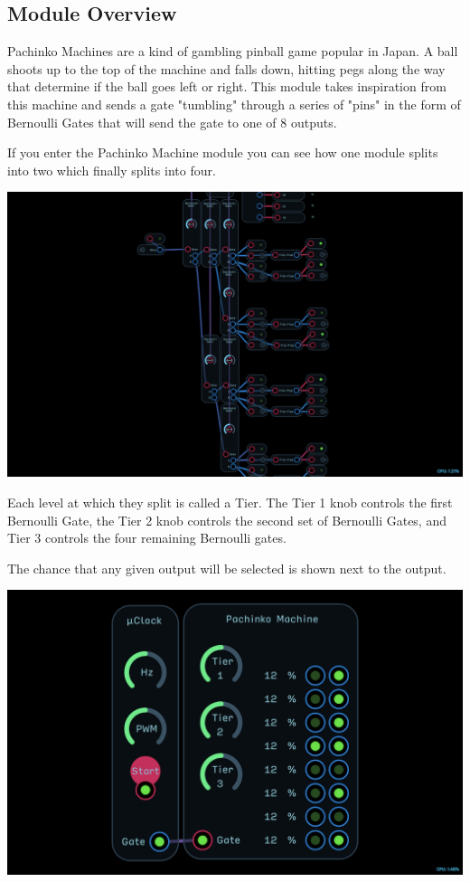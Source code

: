 \documentclass[11pt]{book}
\begin{document}
\begin{multicols*}{2}

\subsection*{Module Overview}

Pachinko Machines are a kind of gambling pinball game popular in Japan. A ball shoots up to the top of the machine and falls down, hitting pegs along the way that determine if the ball goes left or right. This module takes inspiration from this machine and sends a gate "tumbling" through a series of "pins" in the form of Bernoulli Gates that will send the gate to one of 8 outputs.

If you enter the Pachinko Machine module you can see how one module splits into two which finally splits into four.

\begin{center}
\includegraphics[width=0.95\linewidth]{pachinko-machine-fig1.png}
\end{center}

Each level at which they split is called a Tier. The Tier 1 knob controls the first Bernoulli Gate, the Tier 2 knob controls the second set of Bernoulli Gates, and Tier 3 controls the four remaining Bernoulli gates.

The chance that any given output will be selected is shown next to the output.

\begin{center}
\includegraphics[width=0.95\linewidth]{pachinko-machine-fig2.png}
\end{center}


\end{multicols*}
\end{document}
